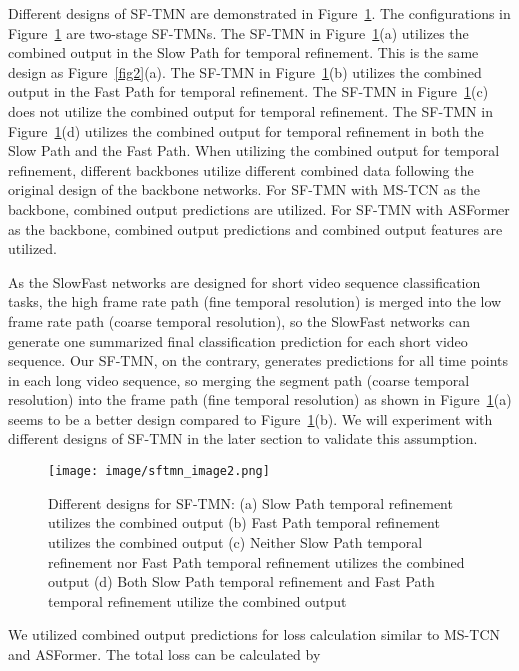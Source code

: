 \documentclass[sn-mathphys,Numbered]{sn-jnl}
\theoremstyle{thmstyleone}\newtheorem{theorem}{Theorem}\newtheorem{proposition}[theorem]{Proposition}
\theoremstyle{thmstyletwo}\newtheorem{example}{Example}\newtheorem{remark}{Remark}
\theoremstyle{thmstylethree}\newtheorem{definition}{Definition}
\begin{document}
Different designs of SF-TMN are demonstrated in Figure~\ref{fig3}. The configurations in Figure~\ref{fig3} are two-stage SF-TMNs. The SF-TMN in Figure~\ref{fig3}(a) utilizes the combined output in the Slow Path for temporal refinement. This is the same design as Figure~\ref{fig2}(a). The SF-TMN in Figure~\ref{fig3}(b) utilizes the combined output in the Fast Path for temporal refinement. The SF-TMN in Figure~\ref{fig3}(c) does not utilize the combined output for temporal refinement. The SF-TMN in Figure~\ref{fig3}(d) utilizes the combined output for temporal refinement in both the Slow Path and the Fast Path. When utilizing the combined output for temporal refinement, different backbones utilize different combined data following the original design of the backbone networks. For SF-TMN with MS-TCN as the backbone, combined output predictions are utilized. For SF-TMN with ASFormer as the backbone, combined output predictions and combined output features are utilized. 

As the SlowFast networks are designed for short video sequence classification tasks, the high frame rate path (fine temporal resolution) is merged into the low frame rate path (coarse temporal resolution), so the SlowFast networks can generate one summarized final classification prediction for each short video sequence. Our SF-TMN, on the contrary, generates predictions for all time points in each long video sequence, so merging the segment path (coarse temporal resolution) into the frame path (fine temporal resolution) as shown in Figure~\ref{fig3}(a) seems to be a better design compared to Figure~\ref{fig3}(b). We will experiment with different designs of SF-TMN in the later section to validate this assumption. 

\begin{figure}[h]\centering
\texttt{[image: image/sftmn\_image2.png]}
\caption{Different designs for SF-TMN: (a) Slow Path temporal refinement utilizes the combined output (b) Fast Path temporal refinement utilizes the combined output (c) Neither Slow Path temporal refinement nor Fast Path temporal refinement utilizes the combined output (d) Both Slow Path temporal refinement and Fast Path temporal refinement utilize the combined output}\label{fig3}
\end{figure}

We utilized combined output predictions for loss calculation similar to MS-TCN and ASFormer. The total loss can be calculated by
\end{document}
